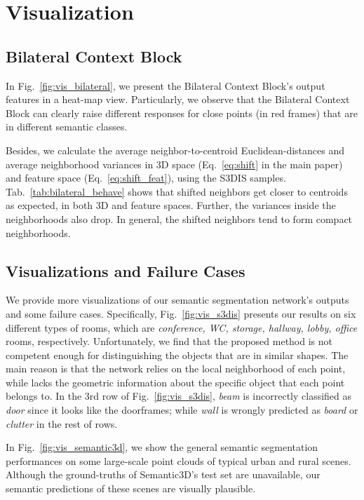 \documentclass[10pt,twocolumn,letterpaper]{article}
\def\ourblock{Bilateral Context Block}
\begin{document}
\section{Visualization}
\subsection{Bilateral Context Block}
In Fig.~\ref{fig:vis_bilateral}, we present the \ourblock's output features in a heat-map view. Particularly, we observe that the Bilateral Context Block can clearly raise different responses for close points (in red frames) that are in different semantic classes.

Besides, we calculate the average neighbor-to-centroid Euclidean-distances and average neighborhood variances in 3D space (Eq.~\ref{eq:shift} in the main paper) and feature space (Eq.~\ref{eq:shift_feat}), using the S3DIS samples. Tab.~\ref{tab:bilateral_behave} shows that shifted neighbors get closer to centroids as expected, in both 3D and feature spaces. Further, the variances inside the neighborhoods also drop. In general, the shifted neighbors tend to form compact neighborhoods.

\subsection{Visualizations and Failure Cases}
We provide more visualizations of our semantic segmentation network's outputs and some failure cases. Specifically, Fig.~\ref{fig:vis_s3dis} presents our results on six different types of rooms, which are \emph{conference, WC, storage, hallway, lobby, office} rooms, respectively. Unfortunately, we find that the proposed method is not competent enough for distinguishing the objects that are in similar shapes. The main reason is that the network relies on the local neighborhood of each point, while lacks the geometric information about the specific object that each point belongs to. In the 3rd row of Fig.~\ref{fig:vis_s3dis}, \emph{beam} is incorrectly classified as \emph{door} since it looks like the doorframes; while \emph{wall} is wrongly predicted as \emph{board} or \emph{clutter} in the rest of rows.  

In Fig.~\ref{fig:vis_semantic3d}, we show the general semantic segmentation performances on some large-scale point clouds of typical urban and rural scenes. Although the ground-truths of Semantic3D's test set are unavailable, our semantic predictions of these scenes are visually plausible.
\end{document}
